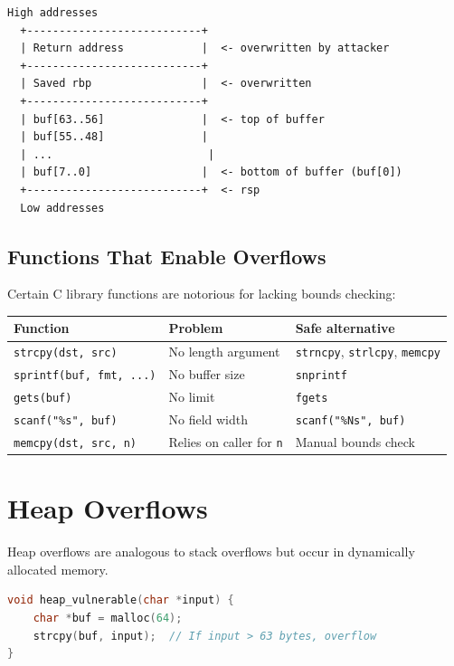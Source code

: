 \begin{lstlisting}[caption=Stack layout during overflow]
  High addresses
  +---------------------------+
  | Return address            |  <- overwritten by attacker
  +---------------------------+
  | Saved rbp                 |  <- overwritten
  +---------------------------+
  | buf[63..56]               |  <- top of buffer
  | buf[55..48]               |
  | ...                        |
  | buf[7..0]                 |  <- bottom of buffer (buf[0])
  +---------------------------+  <- rsp
  Low addresses
\end{lstlisting}

\subsection{Functions That Enable Overflows}

Certain C library functions are notorious for lacking bounds checking:

\begin{longtable}{p{3cm}p{4.5cm}p{4.5cm}}
	\toprule
	\textbf{Function}               & \textbf{Problem}                & \textbf{Safe alternative}                           \\
	\midrule
	\texttt{strcpy(dst, src)}       & No length argument              & \texttt{strncpy}, \texttt{strlcpy}, \texttt{memcpy} \\
	\texttt{sprintf(buf, fmt, ...)} & No buffer size                  & \texttt{snprintf}                                   \\
	\texttt{gets(buf)}              & No limit                        & \texttt{fgets}                                      \\
	\texttt{scanf("\%s", buf)}      & No field width                  & \texttt{scanf("\%Ns", buf)}                         \\
	\texttt{memcpy(dst, src, n)}    & Relies on caller for \texttt{n} & Manual bounds check                                 \\
	\bottomrule
\end{longtable}

\section{Heap Overflows}

Heap overflows are analogous to stack overflows but occur in dynamically allocated memory.

\begin{lstlisting}[language=C, caption=Vulnerable heap buffer]
void heap_vulnerable(char *input) {
    char *buf = malloc(64);
    strcpy(buf, input);  // If input > 63 bytes, overflow
}
\end{lstlisting}

